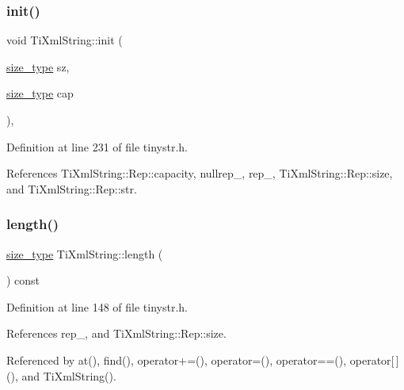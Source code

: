 \subsubsection{\texorpdfstring{init()}{init()}\hspace{0.1cm}{\footnotesize\ttfamily [2/2]}}
{\footnotesize\ttfamily void Ti\+Xml\+String\+::init (\begin{DoxyParamCaption}\item[{\hyperlink{class_ti_xml_string_abeb2c1893a04c17904f7c06546d0b971}{size\+\_\+type}}]{sz,  }\item[{\hyperlink{class_ti_xml_string_abeb2c1893a04c17904f7c06546d0b971}{size\+\_\+type}}]{cap }\end{DoxyParamCaption})\hspace{0.3cm}{\ttfamily [inline]}, {\ttfamily [private]}}



Definition at line 231 of file tinystr.\+h.



References Ti\+Xml\+String\+::\+Rep\+::capacity, nullrep\+\_\+, rep\+\_\+, Ti\+Xml\+String\+::\+Rep\+::size, and Ti\+Xml\+String\+::\+Rep\+::str.

\hypertarget{class_ti_xml_string_a5db17f8314ffe2a89df0f0eb6c2a4bf5}{}\label{class_ti_xml_string_a5db17f8314ffe2a89df0f0eb6c2a4bf5} 
\subsubsection{\texorpdfstring{length()}{length()}}
{\footnotesize\ttfamily \hyperlink{class_ti_xml_string_abeb2c1893a04c17904f7c06546d0b971}{size\+\_\+type} Ti\+Xml\+String\+::length (\begin{DoxyParamCaption}{ }\end{DoxyParamCaption}) const\hspace{0.3cm}{\ttfamily [inline]}}



Definition at line 148 of file tinystr.\+h.



References rep\+\_\+, and Ti\+Xml\+String\+::\+Rep\+::size.



Referenced by at(), find(), operator+=(), operator=(), operator==(), operator\mbox{[}$\,$\mbox{]}(), and Ti\+Xml\+String().

\hypertarget{class_ti_xml_string_ab56336ac2aa2a08d24a71eb9a2b502a5}{}\label{class_ti_xml_string_ab56336ac2aa2a08d24a71eb9a2b502a5} 
